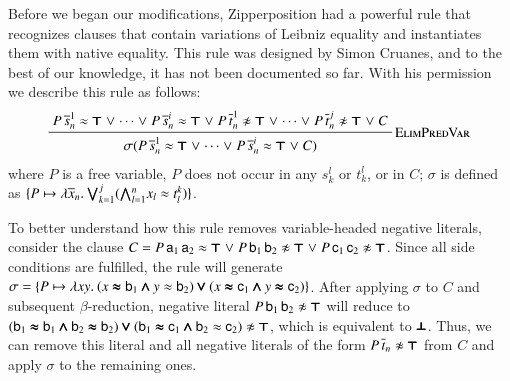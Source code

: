 Before we began our modifications, Zipperposition had a powerful rule that
recognizes clauses that contain variations of Leibniz equality and instantiates
them with native equality. This rule was designed by Simon Cruanes, and to the
best of our knowledge, it has not been documented so far. With his permission
we describe this rule as follows:
\pagebreak[2]
%
$$\namedinference{ElimPredVar}{P \, \overline{s}_n^1 \eq \itrue \llor \cdots \llor
    P \, \overline{s}_n^i \eq \itrue \llor P \, \overline{t}_n^1 \noteq \itrue \llor
    \cdots \llor P \, \overline{t}_n^j \noteq \itrue \llor C} 
    {\sigmacl{P \, \overline{s}_n^1
    \eq \itrue \llor \cdots \llor P \, \overline{s}_n^i \eq \itrue  \llor C}} $$
where $P$ is a free variable, $P$ does not occur in any $s_k^l$ or $t_k^l$, or
in $C$; $\sigma$ is defined as $\{ P \mapsto \lambda \overline{x}_{n}.\> \pmb{\bigvee}_{k=1}^{j}
(\pmb{\bigwedge}_{l=1}^{n} x_l \approx t^k_l )  \}$. 

To better understand how this rule removes variable-headed negative literals,
consider the clause $C = P \, \mathsf{a}_1 \, \mathsf{a}_2 \approx \pmb{\top} \mathrel\lor P \,
\mathsf{b}_1 \, \mathsf{b}_2 \not\approx \pmb{\top} \mathrel\lor P \, \mathsf{c}_1 \, \mathsf{c}_2 \not\approx
\pmb{\top}$. Since all side conditions are fulfilled, the rule 
will generate $\sigma = \{ P \mapsto \lambda xy.\> (x \pmb{\approx} \mathsf{b}_1
\pmb{\land} y \approx \mathsf{b}_2) \pmb{\lor} (x \pmb{\approx} \mathsf{c}_1 \pmb{\land} y \pmb{\approx} \mathsf{c}_2)   \}$.
After applying $\sigma$ to $C$ and subsequent $\beta$-reduction, negative literal
$  P \, \mathsf{b}_1 \, \mathsf{b}_2 \not\approx \pmb{\top}$ will reduce to 
$ (\cst{b}_1 \ieq \cst{b}_1 \iand \cst{b}_2 \ieq \cst{b}_2) \ior (\cst{b}_1 \ieq \cst{c}_1 \iand \cst{b}_2 \eq \cst{c}_2) \noteq \itrue $,
which is equivalent to $\pmb{\bot}$. Thus, we can remove this literal and all negative literals
of the form $P \, \overline{t}_n \noteq \itrue$ from $C$ and apply $\sigma$ to the remaining ones.

